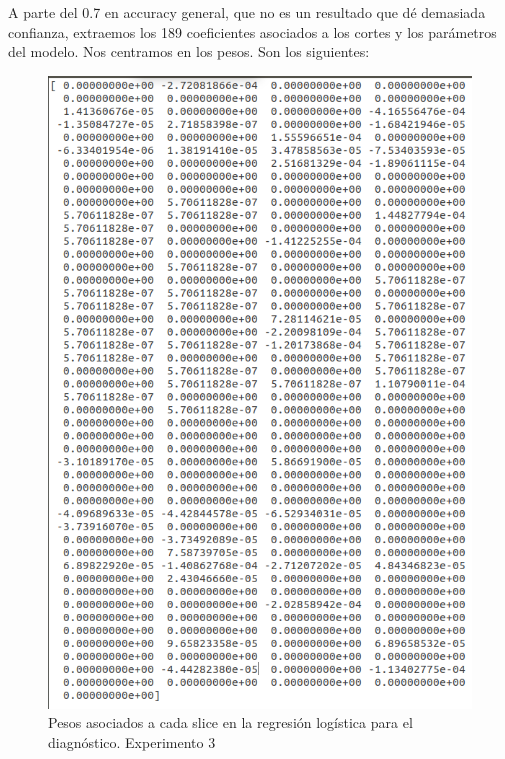 A parte del 0.7 en accuracy general, que no es un resultado que dé demasiada confianza, extraemos los 189 coeficientes asociados a los cortes y los parámetros del modelo. Nos centramos en los pesos. Son los siguientes:


\begin{figure}[H] %
	\centering
	\includegraphics[scale=0.65]{probs-exp3.png}  %
	\caption{Pesos asociados a cada slice en la regresión logística para el diagnóstico. Experimento 3} 
	\label{fig:probs-exp3}
\end{figure}

